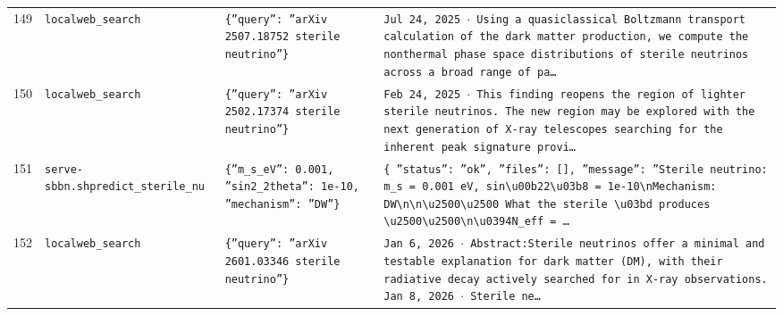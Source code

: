 \documentclass[11pt,a4paper]{article}
\begin{document}
\begin{longtable}{@{}p{}p{}p{}p{}@{}}
149 & \texttt{local}\newline\texttt{web\_\allowbreak{}search} & \texttt{\{''query'':\allowbreak{} ''arXiv 2507.18752 sterile neutrino''\}\allowbreak{}} & \texttt{Jul 24,\allowbreak{} 2025 $\cdot$ Using a quasiclassical Boltzmann transport calculation of the dark matter production,\allowbreak{} we compute the nonthermal phase space distributions of sterile neutrinos across a broad range of pa\ldots{}\allowbreak{}} \\
150 & \texttt{local}\newline\texttt{web\_\allowbreak{}search} & \texttt{\{''query'':\allowbreak{} ''arXiv 2502.17374 sterile neutrino''\}\allowbreak{}} & \texttt{Feb 24,\allowbreak{} 2025 $\cdot$ This finding reopens the region of lighter sterile neutrinos. The new region may be explored with the next generation of X-ray telescopes searching for the inherent peak signature provi\ldots{}\allowbreak{}} \\
151 & \texttt{serve-sbbn.sh}\newline\texttt{predict\_\allowbreak{}sterile\_\allowbreak{}nu} & \texttt{\{''m\_\allowbreak{}s\_\allowbreak{}eV'':\allowbreak{} 0.001,\allowbreak{} ''sin2\_\allowbreak{}2theta'':\allowbreak{} 1e-10,\allowbreak{} ''mechanism'':\allowbreak{} ''DW''\}\allowbreak{}} & \texttt{\{   ''status'':\allowbreak{} ''ok'',\allowbreak{}   ''files'':\allowbreak{} []\allowbreak{},\allowbreak{}   ''message'':\allowbreak{} ''Sterile neutrino:\allowbreak{} m\_\allowbreak{}s =\allowbreak{} 0.001 eV,\allowbreak{} sin\textbackslash{}\allowbreak{}u00b22\textbackslash{}\allowbreak{}u03b8 =\allowbreak{} 1e-10\textbackslash{}\allowbreak{}nMechanism:\allowbreak{} DW\textbackslash{}\allowbreak{}n\textbackslash{}\allowbreak{}n\textbackslash{}\allowbreak{}u2500\textbackslash{}\allowbreak{}u2500 What the sterile \textbackslash{}\allowbreak{}u03bd produces \textbackslash{}\allowbreak{}u2500\textbackslash{}\allowbreak{}u2500\textbackslash{}\allowbreak{}n\textbackslash{}\allowbreak{}u0394N\_\allowbreak{}eff =\allowbreak{} \ldots{}\allowbreak{}} \\
152 & \texttt{local}\newline\texttt{web\_\allowbreak{}search} & \texttt{\{''query'':\allowbreak{} ''arXiv 2601.03346 sterile neutrino''\}\allowbreak{}} & \texttt{Jan 6,\allowbreak{} 2026 $\cdot$ Abstract:\allowbreak{}Sterile neutrinos offer a minimal and testable explanation for dark matter (DM)\allowbreak{},\allowbreak{} with their radiative decay actively searched for in X-ray observations. Jan 8,\allowbreak{} 2026 $\cdot$ Sterile ne\ldots{}\allowbreak{}} \\

\end{longtable}
\end{document}
